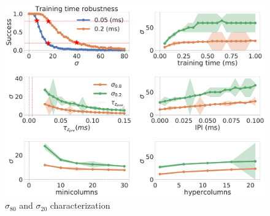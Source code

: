 \documentclass[10pt,a4paper]{article}
\begin{document}
\begin{figure}[H]
\centering
\includegraphics[scale=0.20]{noise_robustness_appendix.pdf}
\caption{$\sigma_{80}$ and $\sigma_{20}$ characterization}
\label{fig:appendix_noise_sensitivity}
\end{figure}




\end{document}
